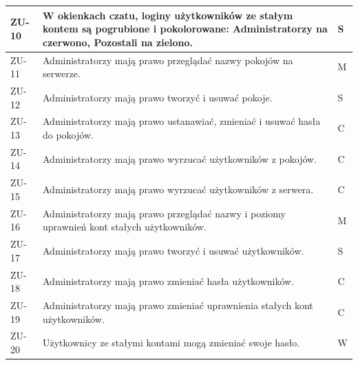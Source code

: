 \documentclass[11pt,oneside,a4paper,titlepage,onecolumn]{article}
\begin{document}
\begin{tabular}{ | l | l | l | }
    \hline
    ZU-10 & \parbox[t]{14cm}{
      W okienkach czatu, loginy użytkowników ze stałym kontem są pogrubione i pokolorowane: Administratorzy na czerwono,
      Pozostali na zielono. 
      } & S \\

    \hline
    ZU-11 & \parbox[t]{14cm}{
      Administratorzy mają prawo przeglądać nazwy pokojów na serwerze. 
    } & M \\

    \hline
    ZU-12 & \parbox[t]{14cm}{
      Administratorzy mają prawo tworzyć i usuwać pokoje. 
    } & S \\

    \hline
    ZU-13 & \parbox[t]{14cm}{
      Administratorzy mają prawo ustanawiać, zmieniać i usuwać hasła do pokojów. 
    } & C \\

    \hline
    ZU-14 & \parbox[t]{14cm}{
      Administratorzy mają prawo wyrzucać użytkowników z pokojów. 
    } & C \\

    \hline
    ZU-15 & \parbox[t]{14cm}{
      Administratorzy mają prawo wyrzucać użytkowników z serwera. 
    } & C \\

    \hline
    ZU-16 & \parbox[t]{14cm}{
      Administratorzy mają prawo przeglądać nazwy i poziomy uprawnień kont stałych użytkowników. 
    } & M \\

    \hline
    ZU-17 & \parbox[t]{14cm}{
      Administratorzy mają prawo tworzyć i usuwać użytkowników. 
    } & S \\

    \hline
    ZU-18 & \parbox[t]{14cm}{
      Administratorzy mają prawo zmieniać hasła użytkowników. 
    } & C \\

    \hline
    ZU-19 & \parbox[t]{14cm}{
      Administratorzy mają prawo zmieniać uprawnienia stałych kont użytkowników. 
    } & C \\

    \hline
    ZU-20 & \parbox[t]{14cm}{
      Użytkownicy ze stałymi kontami mogą zmieniać swoje hasło.
    } & W \\

    
    \hline
  \end{tabular}
\end{document}
